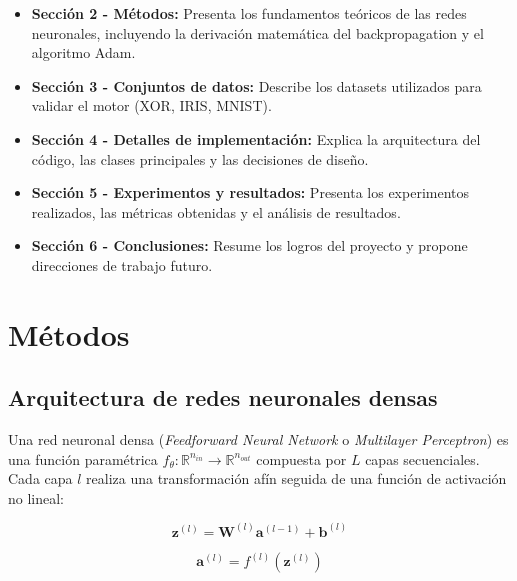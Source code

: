 \documentclass[a4paper,11pt]{article}
\begin{document}
\begin{itemize}
    \item \textbf{Sección 2 - Métodos:} Presenta los fundamentos teóricos de las redes neuronales, incluyendo la derivación matemática del backpropagation y el algoritmo Adam.
    
    \item \textbf{Sección 3 - Conjuntos de datos:} Describe los datasets utilizados para validar el motor (XOR, IRIS, MNIST).
    
    \item \textbf{Sección 4 - Detalles de implementación:} Explica la arquitectura del código, las clases principales y las decisiones de diseño.
    
    \item \textbf{Sección 5 - Experimentos y resultados:} Presenta los experimentos realizados, las métricas obtenidas y el análisis de resultados.
    
    \item \textbf{Sección 6 - Conclusiones:} Resume los logros del proyecto y propone direcciones de trabajo futuro.
\end{itemize}

\newpage
\section{Métodos}

\subsection{Arquitectura de redes neuronales densas}

Una red neuronal densa (\textit{Feedforward Neural Network} o \textit{Multilayer Perceptron}) es una función paramétrica $f_\theta: \mathbb{R}^{n_{in}} \rightarrow \mathbb{R}^{n_{out}}$ compuesta por $L$ capas secuenciales. Cada capa $l$ realiza una transformación afín seguida de una función de activación no lineal:

\begin{equation}
\mathbf{z}^{(l)} = \mathbf{W}^{(l)} \mathbf{a}^{(l-1)} + \mathbf{b}^{(l)}
\end{equation}

\begin{equation}
\mathbf{a}^{(l)} = f^{(l)}(\mathbf{z}^{(l)})
\end{equation}
\end{document}
